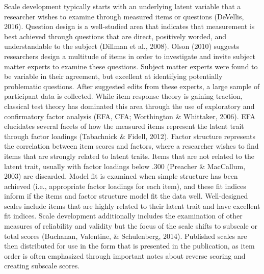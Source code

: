 \documentclass[english,man]{apa6}
\theoremstyle{definition}
\theoremstyle{definition}
\theoremstyle{definition}
\theoremstyle{remark}
\begin{document}
Scale development typically starts with an underlying latent variable
that a researcher wishes to examine through measured items or questions
(DeVellis, 2016). Question design is a well-studied area that indicates
that measurement is best achieved through questions that are direct,
positively worded, and understandable to the subject (Dillman et al.,
2008). Olson (2010) suggests researchers design a multitude of items in
order to investigate and invite subject matter experts to examine these
questions. Subject matter experts were found to be variable in their
agreement, but excellent at identifying potentially problematic
questions. After suggested edits from these experts, a large sample of
participant data is collected. While item response theory is gaining
traction, classical test theory has dominated this area through the use
of exploratory and confirmatory factor analysis (EFA, CFA; Worthington
\& Whittaker, 2006). EFA elucidates several facets of how the measured
items represent the latent trait through factor loadings (Tabachnick \&
Fidell, 2012). Factor structure represents the correlation between item
scores and factors, where a researcher wishes to find items that are
strongly related to latent traits. Items that are not related to the
latent trait, usually with factor loadings below .300 (Preacher \&
MacCallum, 2003) are discarded. Model fit is examined when simple
structure has been achieved (i.e., appropriate factor loadings for each
item), and these fit indices inform if the items and factor structure
model fit the data well. Well-designed scales include items that are
highly related to their latent trait and have excellent fit indices.
Scale development additionally includes the examination of other
measures of reliability and validity but the focus of the scale shifts
to subscale or total scores (Buchanan, Valentine, \& Schulenberg, 2014).
Published scales are then distributed for use in the form that is
presented in the publication, as item order is often emphasized through
important notes about reverse scoring and creating subscale scores.
\end{document}
